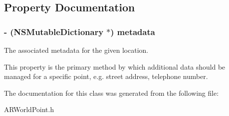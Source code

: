 \subsection{Property Documentation}
\hypertarget{interface_a_r_world_point_a25146859c4e3ab1a0bf9ba74e3fdb763}{
\subsubsection[{metadata}]{\setlength{\rightskip}{0pt plus 5cm}-\/ (NSMutableDictionary $\ast$) metadata}}
\label{interface_a_r_world_point_a25146859c4e3ab1a0bf9ba74e3fdb763}


The associated metadata for the given location. 

This property is the primary method by which additional data should be managed for a specific point, e.g. street address, telephone number. 

The documentation for this class was generated from the following file:\begin{DoxyCompactItemize}
\item 
ARWorldPoint.h\end{DoxyCompactItemize}
